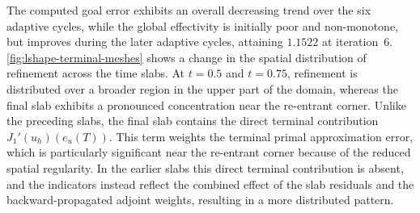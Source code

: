 The computed goal error exhibits an overall decreasing trend over the six adaptive cycles,
while the global effectivity is initially poor and non-monotone, but improves during the later adaptive cycles, attaining \(1.1522\) at iteration~6. 
\cref{fig:lshape-terminal-meshes} shows a change in the spatial distribution of refinement across the time slabs. At \(t=0.5\) and \(t=0.75\), refinement is distributed over a broader region in the upper part of the domain, whereas the final slab exhibits a pronounced concentration near the re-entrant corner. Unlike the preceding slabs, the final slab contains the direct terminal contribution \(J_1'(u_h)(e_u(T))\). This term weights the terminal primal approximation error, which is particularly significant near the re-entrant corner because of the reduced spatial regularity. In the earlier slabs this direct terminal contribution is absent, and the indicators instead reflect the combined effect of the slab residuals and the backward-propagated adjoint weights, resulting in a more distributed pattern.

